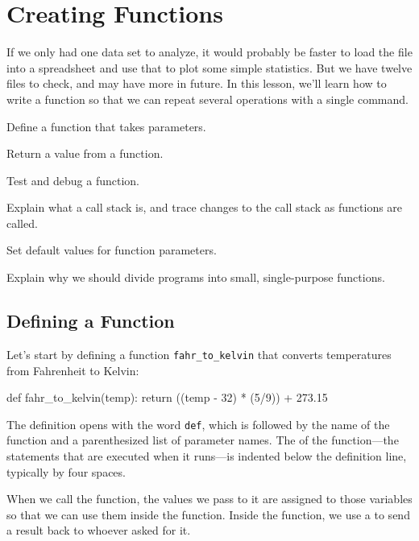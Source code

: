 \documentclass{book}
\begin{document}
\section{Creating Functions}

If we only had one data set to analyze, it would probably be faster to
load the file into a spreadsheet and use that to plot some simple
statistics. But we have twelve files to check, and may have more in
future. In this lesson, we'll learn how to write a function so that we
can repeat several operations with a single command.

\begin{objectives}
\begin{swcitemize}
\item
  Define a function that takes parameters.
\item
  Return a value from a function.
\item
  Test and debug a function.
\item
  Explain what a call stack is, and trace changes to the call stack as
  functions are called.
\item
  Set default values for function parameters.
\item
  Explain why we should divide programs into small, single-purpose
  functions.
\end{swcitemize}
\end{objectives}

\subsection{Defining a Function}

Let's start by defining a function \texttt{fahr\_to\_kelvin} that
converts temperatures from Fahrenheit to Kelvin:

\begin{VerbIn}
def fahr_to_kelvin(temp):
    return ((temp - 32) * (5/9)) + 273.15
\end{VerbIn}

The definition opens with the word \texttt{def}, which is followed by
the name of the function and a parenthesized list of parameter names.
The  of the function---the statements
that are executed when it runs---is indented below the definition line,
typically by four spaces.

When we call the function, the values we pass to it are assigned to
those variables so that we can use them inside the function. Inside the
function, we use a  to
send a result back to whoever asked for it.
\end{document}
